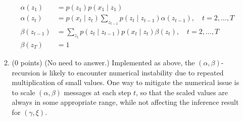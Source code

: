 \documentclass[a3paper,12pt]{extarticle} %
\begin{document}
\begin{enumerate}
\begin{enumerate}
\begin{align}
        \alpha(z_1) &= p(z_1) p(x_1 \mid z_1) \tag{26} \\
        \alpha(z_t) &= p(x_t \mid z_t) \sum_{z_{t-1}} p(z_t \mid z_{t-1}) \alpha(z_{t-1}), \quad t = 2, \ldots, T \tag{27} \\
        \beta(z_{t-1}) &= \sum_{z_t} p(z_t \mid z_{t-1}) p(x_t \mid z_t) \beta(z_t), \quad t = 2, \ldots, T \tag{28} \\
        \beta(z_T) &= 1 \tag{29}
    \end{align}
    \item (0 points) (No need to answer.) Implemented as above, the $(\alpha, \beta)$-recursion is likely to encounter numerical instability due to repeated multiplication of small values. One way to mitigate the numerical issue is to scale $(\alpha, \beta)$ messages at each step $t$, so that the scaled values are always in some appropriate range, while not affecting the inference result for $(\gamma, \xi)$.


\end{enumerate}
\end{enumerate}
\end{document}

